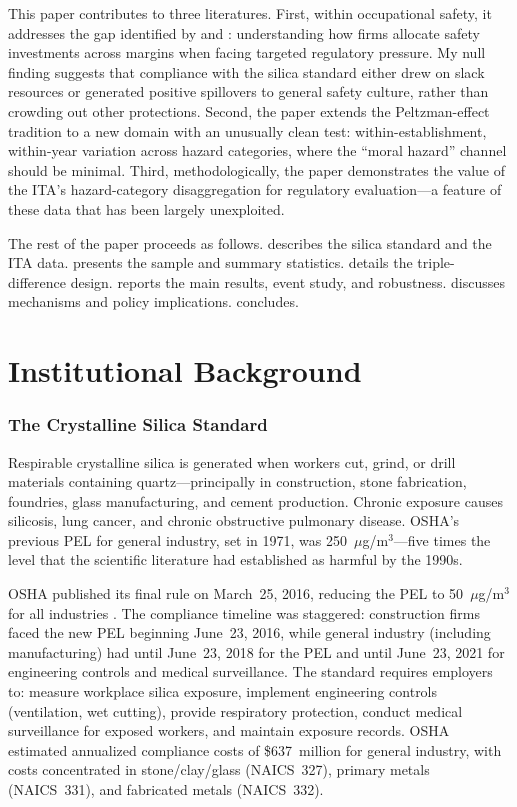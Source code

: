 \documentclass[12pt]{article}
\begin{document}
This paper contributes to three literatures. First, within occupational safety, it addresses the gap identified by \citet{shimshack2014environmental} and \citet{johnson2023safety}: understanding how firms allocate safety investments across margins when facing targeted regulatory pressure. My null finding suggests that compliance with the silica standard either drew on slack resources or generated positive spillovers to general safety culture, rather than crowding out other protections. Second, the paper extends the Peltzman-effect tradition \citep{peltzman1975effects, viscusi1992fatal} to a new domain with an unusually clean test: within-establishment, within-year variation across hazard categories, where the ``moral hazard'' channel should be minimal. Third, methodologically, the paper demonstrates the value of the ITA's hazard-category disaggregation for regulatory evaluation---a feature of these data that has been largely unexploited.

The rest of the paper proceeds as follows.  describes the silica standard and the ITA data.  presents the sample and summary statistics.  details the triple-difference design.  reports the main results, event study, and robustness.  discusses mechanisms and policy implications.  concludes.


\section{Institutional Background}
\label{sec:background}

\subsubsection*{The Crystalline Silica Standard}
Respirable crystalline silica is generated when workers cut, grind, or drill materials containing quartz---principally in construction, stone fabrication, foundries, glass manufacturing, and cement production. Chronic exposure causes silicosis, lung cancer, and chronic obstructive pulmonary disease. OSHA's previous PEL for general industry, set in 1971, was 250~$\mu$g/m$^3$---five times the level that the scientific literature had established as harmful by the 1990s.

OSHA published its final rule on March~25, 2016, reducing the PEL to 50~$\mu$g/m$^3$ for all industries \citep{osha2016silica}. The compliance timeline was staggered: construction firms faced the new PEL beginning June~23, 2016, while general industry (including manufacturing) had until June~23, 2018 for the PEL and until June~23, 2021 for engineering controls and medical surveillance. The standard requires employers to: measure workplace silica exposure, implement engineering controls (ventilation, wet cutting), provide respiratory protection, conduct medical surveillance for exposed workers, and maintain exposure records. OSHA estimated annualized compliance costs of \$637~million for general industry, with costs concentrated in stone/clay/glass (NAICS~327), primary metals (NAICS~331), and fabricated metals (NAICS~332).
\end{document}
